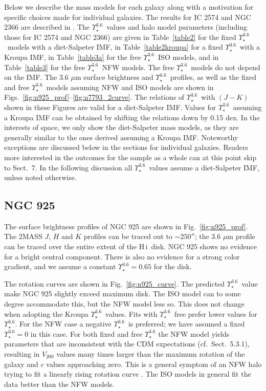 \documentclass[usenatbib,usegraphicx,apjfonts,floatfix]{emulateapj}
\newcommand{\HI}{H\,{\sc i}}
\newcommand{\Ups}{\ensuremath{\Upsilon_{\star}^{3.6}}}
\begin{document}
Below we describe the mass models for each galaxy along with a
motivation for specific choices made for individual galaxies.  The
results for IC 2574 and NGC 2366 are described in \citet{oh2007}.  The
\Ups\ values and halo model parameters (including those for IC 2574
and NGC 2366) are given in Table~\ref{table2} for the fixed \Ups\
models with a diet-Salpeter IMF, in Table~\ref{table2kroupa} for a fixed
\Ups\ with a Kroupa IMF, in Table~\ref{table3a} for the free \Ups\ ISO
models, and in Table~\ref{table3} for the free \Ups\ NFW models.  The
free \Ups\ models do not depend on the IMF.  The 3.6 $\mu$m surface
brightness and \Ups\ profiles, as well as the fixed and free \Ups\
models assuming NFW and ISO models are shown in
Figs.~\ref{fig:n925_prof}--\ref{fig:n7793_2curve}.  The relations of
\Ups\ with $(J-K)$ shown in these Figures are valid for a
diet-Salpeter IMF. Values for \Ups\ assuming a Kroupa IMF can be
obtained by shifting the relations down by 0.15 dex.  In the interests
of space, we only show the diet-Salpeter mass models, as they are
generally similar to the ones derived assuming a Kroupa
IMF. Noteworthy exceptions are discussed below in the sections for
individual galaxies. Readers more interested in the outcomes for the
sample as a whole can at this point skip to Sect.~7.
In the following discussion all \Ups\ values assume a diet-Salpeter IMF, unless
noted otherwise.


\subsection{NGC 925}

The surface brightness profiles of NGC 925 are shown in
Fig.~\ref{fig:n925_prof}. The 2MASS $J$, $H$ and $K$ profiles can be
traced out to $\sim 250''$; the 3.6 $\mu$m profile can be traced over
the entire extent of the \HI\ disk.  NGC 925 shows no evidence for a
bright central component.  There is also no evidence for a strong
color gradient, and we assume a constant $\Ups = 0.65$ for the disk.

The rotation curves are shown in Fig.~\ref{fig:n925_curve}. The
predicted \Ups\ value make NGC 925 slightly exceed maximum disk. The
ISO model can to some degree accommodate this, but the NFW model less
so. This does not change when adopting the Kroupa \Ups\ values. Fits
with \Ups\ free prefer lower values for \Ups. For the NFW case a
negative \Ups\ is preferred; we have assumed a fixed $\Ups=0$ in this
case.  For both fixed and free $\Ups$ the NFW model yields parameters
that are inconsistent with the CDM expectations (cf.\ Sect.~5.3.1),
resulting in $V_{200}$ values many times larger than the maximum
rotation of the galaxy and $c$ values approaching zero. This is a
general symptom of an NFW halo trying to fit a linearly rising
rotation curve \citep{mcgaugh98}. The ISO models in general fit the
data better than the NFW models.
\end{document}
